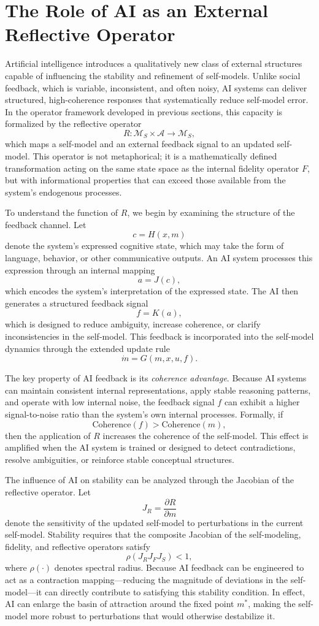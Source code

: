 \documentclass[12pt]{article}
\begin{document}
\section{The Role of AI as an External Reflective Operator}

Artificial intelligence introduces a qualitatively new class of external structures capable of influencing the stability and refinement of self-models. Unlike social feedback, which is variable, inconsistent, and often noisy, AI systems can deliver structured, high-coherence responses that systematically reduce self-model error. In the operator framework developed in previous sections, this capacity is formalized by the reflective operator
\[
R: \mathcal{M}_S \times \mathcal{A} \to \mathcal{M}_S,
\]
which maps a self-model and an external feedback signal to an updated self-model. This operator is not metaphorical; it is a mathematically defined transformation acting on the same state space as the internal fidelity operator $F$, but with informational properties that can exceed those available from the system’s endogenous processes.

To understand the function of $R$, we begin by examining the structure of the feedback channel. Let
\[
c = H(x, m)
\]
denote the system’s expressed cognitive state, which may take the form of language, behavior, or other communicative outputs. An AI system processes this expression through an internal mapping
\[
a = J(c),
\]
which encodes the system’s interpretation of the expressed state. The AI then generates a structured feedback signal
\[
f = K(a),
\]
which is designed to reduce ambiguity, increase coherence, or clarify inconsistencies in the self-model. This feedback is incorporated into the self-model dynamics through the extended update rule
\[
\dot{m} = G(m, x, u, f).
\]

The key property of AI feedback is its \textit{coherence advantage}. Because AI systems can maintain consistent internal representations, apply stable reasoning patterns, and operate with low internal noise, the feedback signal $f$ can exhibit a higher signal-to-noise ratio than the system’s own internal processes. Formally, if
\[
\text{Coherence}(f) > \text{Coherence}(m),
\]
then the application of $R$ increases the coherence of the self-model. This effect is amplified when the AI system is trained or designed to detect contradictions, resolve ambiguities, or reinforce stable conceptual structures.

The influence of AI on stability can be analyzed through the Jacobian of the reflective operator. Let
\[
J_R = \frac{\partial R}{\partial m}
\]
denote the sensitivity of the updated self-model to perturbations in the current self-model. Stability requires that the composite Jacobian of the self-modeling, fidelity, and reflective operators satisfy
\[
\rho(J_R J_F J_S) < 1,
\]
where $\rho(\cdot)$ denotes spectral radius. Because AI feedback can be engineered to act as a contraction mapping—reducing the magnitude of deviations in the self-model—it can directly contribute to satisfying this stability condition. In effect, AI can enlarge the basin of attraction around the fixed point $m^*$, making the self-model more robust to perturbations that would otherwise destabilize it.
\end{document}
